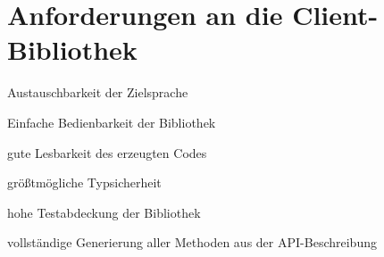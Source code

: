 \section{Anforderungen an die Client-Bibliothek}
\label{item:requirements}

\begin{compactitem}
    \item Austauschbarkeit der Zielsprache
    \item Einfache Bedienbarkeit der Bibliothek
    \item gute Lesbarkeit des erzeugten Codes
    \item größtmögliche Typsicherheit
    \item hohe Testabdeckung der Bibliothek
    \item vollständige Generierung aller Methoden aus der \gls{API}-Beschreibung
\end{compactitem}
